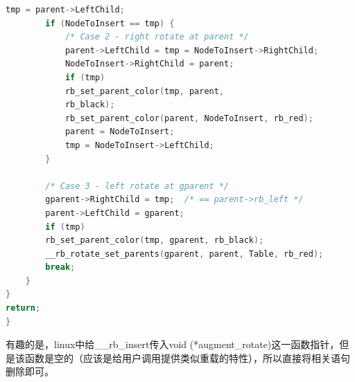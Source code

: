 \begin{lstlisting}[language=C]
        tmp = parent->LeftChild;
        if (NodeToInsert == tmp) {
            /* Case 2 - right rotate at parent */
            parent->LeftChild = tmp = NodeToInsert->RightChild;
            NodeToInsert->RightChild = parent;
            if (tmp)
            rb_set_parent_color(tmp, parent,
            rb_black);
            rb_set_parent_color(parent, NodeToInsert, rb_red);
            parent = NodeToInsert;
            tmp = NodeToInsert->LeftChild;
        }

        /* Case 3 - left rotate at gparent */
        gparent->RightChild = tmp;  /* == parent->rb_left */
        parent->LeftChild = gparent;
        if (tmp)
        rb_set_parent_color(tmp, gparent, rb_black);
        __rb_rotate_set_parents(gparent, parent, Table, rb_red);
        break;
    }
}
return;
}
\end{lstlisting}

有趣的是，linux中给\_\_rb\_insert传入void (*augment\_rotate)这一函数指针，但是该函数是空的（应该是给用户调用提供类似重载的特性），所以直接将相关语句删除即可。

